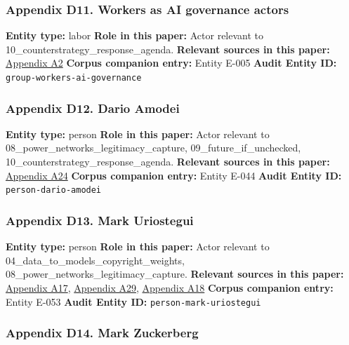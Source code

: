 \documentclass[
  american,
  11pt,
  letterpaper,
]{article}
\begin{document}
\subsubsection{Appendix D11. Workers as AI governance
actors}\label{appendix-d11-workers-as-ai-governance-actors}

\textbf{Entity type:} labor \textbf{Role in this paper:} Actor relevant
to 10\_counterstrategy\_response\_agenda. \textbf{Relevant sources in
this paper:}
\hyperref[appendix-a2-in-oxford-handbook-on-ai-governance-the-role-of-workers-in-ai-ethics-and-governance]{Appendix
A2} \textbf{Corpus companion entry:} Entity E-005 \textbf{Audit Entity
ID:} \texttt{group-workers-ai-governance}

\subsubsection{Appendix D12. Dario
Amodei}\label{appendix-d12-dario-amodei}

\textbf{Entity type:} person \textbf{Role in this paper:} Actor relevant
to 08\_power\_networks\_legitimacy\_capture, 09\_future\_if\_unchecked,
10\_counterstrategy\_response\_agenda. \textbf{Relevant sources in this
paper:} \hyperref[appendix-a24-the-adolescence-of-technology]{Appendix
A24} \textbf{Corpus companion entry:} Entity E-044 \textbf{Audit Entity
ID:} \texttt{person-dario-amodei}

\subsubsection{Appendix D13. Mark
Uriostegui}\label{appendix-d13-mark-uriostegui}

\textbf{Entity type:} person \textbf{Role in this paper:} Actor relevant
to 04\_data\_to\_models\_copyright\_weights,
08\_power\_networks\_legitimacy\_capture. \textbf{Relevant sources in
this paper:}
\hyperref[appendix-a17-ai-copyright-weights-a-new-frontier-in-intellectual-property-law]{Appendix
A17},
\hyperref[appendix-a29-how-ai-is-ruining-your-life-to-build-an-empire]{Appendix
A29},
\hyperref[appendix-a18-bipartisan-house-task-force-report-on-artificial-intelligence]{Appendix
A18} \textbf{Corpus companion entry:} Entity E-053 \textbf{Audit Entity
ID:} \texttt{person-mark-uriostegui}

\subsubsection{Appendix D14. Mark
Zuckerberg}\label{appendix-d14-mark-zuckerberg}
\end{document}
